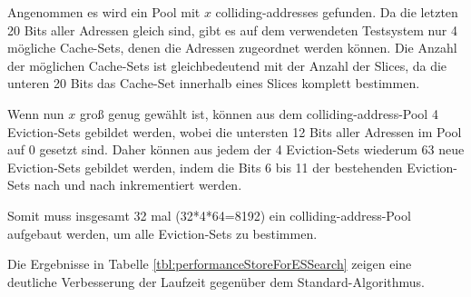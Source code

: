 Angenommen es wird ein Pool mit $x$ colliding-addresses gefunden.
Da die letzten 20 Bits aller Adressen gleich sind, gibt es auf dem verwendeten Testsystem nur 4 mögliche Cache-Sets, denen die Adressen zugeordnet werden können.
Die Anzahl der möglichen Cache-Sets ist gleichbedeutend mit der Anzahl der Slices, da die unteren 20 Bits das Cache-Set innerhalb eines Slices komplett bestimmen.

Wenn nun $x$ groß genug gewählt ist, können aus dem colliding-address-Pool 4 Eviction-Sets gebildet werden, wobei die untersten 12 Bits aller Adressen im Pool auf 0 gesetzt sind. Daher können aus jedem der 4 Eviction-Sets wiederum 63 neue Eviction-Sets gebildet werden, indem die Bits 6 bis 11 der bestehenden Eviction-Sets nach und nach inkrementiert werden.

Somit muss insgesamt 32 mal (32*4*64=8192) ein colliding-address-Pool aufgebaut werden, um alle Eviction-Sets zu bestimmen.

Die Ergebnisse in Tabelle \ref{tbl:performanceStoreForESSearch} zeigen eine deutliche Verbesserung der Laufzeit gegenüber dem Standard-Algorithmus.

